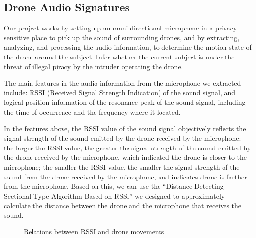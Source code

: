 \documentclass{sig-alternate-10pt}
\begin{document}
\subsection{Drone Audio Signatures}
Our project works by setting up an omni-directional microphone in a privacy-sensitive place to pick up the sound of surrounding drones, and by extracting, analyzing, and processing the audio information, to determine the motion state of the drone around the subject. Infer whether the current subject is under the threat of illegal piracy by the intruder operating the drone.

The main features in the audio information from the microphone we extracted include: RSSI (Received Signal Strength Indication) of the sound signal, and logical position information of the resonance peak of the sound signal, including the time of occurrence and the frequency where it located.

In the features above, the RSSI value of the sound signal objectively reflects the signal strength of the sound emitted by the drone received by the microphone: the larger the RSSI value, the greater the signal strength of the sound emitted by the drone received by the microphone, which indicated the drone is closer to the microphone; the smaller the RSSI value, the smaller the signal strength of the sound from the drone received by the microphone, and indicates drone is farther from the microphone. Based on this, we can use the “Distance-Detecting Sectional Type Algorithm Based on RSSI” we designed to approximately calculate the distance between the drone and the microphone that receives the sound. 

\begin{figure}[!t]
	\centering
	\caption{Relations between RSSI and drone movements}
	\label{rssi}
\end{figure}
\end{document}
